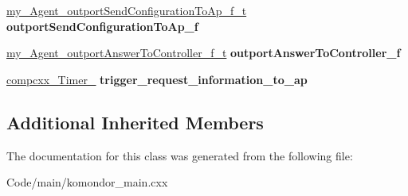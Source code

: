 \begin{DoxyCompactItemize}
\item 
\mbox{\label{classcompcxx__Agent__25_abe7d79ae04ff57646e7d29030f8a36c2}} 
\hyperlink{classcompcxx__Agent__25_1_1my__Agent__outportSendConfigurationToAp__f__t}{my\+\_\+\+Agent\+\_\+outport\+Send\+Configuration\+To\+Ap\+\_\+f\+\_\+t} {\bfseries outport\+Send\+Configuration\+To\+Ap\+\_\+f}
\item 
\mbox{\label{classcompcxx__Agent__25_ab5641f447eebe576ae65136ab8229712}} 
\hyperlink{classcompcxx__Agent__25_1_1my__Agent__outportAnswerToController__f__t}{my\+\_\+\+Agent\+\_\+outport\+Answer\+To\+Controller\+\_\+f\+\_\+t} {\bfseries outport\+Answer\+To\+Controller\+\_\+f}
\item 
\mbox{\label{classcompcxx__Agent__25_a662cb6f32dac818e3a215f9cb4a9f73d}} 
\hyperlink{classcompcxx__Timer__20}{compcxx\+\_\+\+Timer\+\_} {\bfseries trigger\+\_\+request\+\_\+information\+\_\+to\+\_\+ap}
\end{DoxyCompactItemize}
\subsection*{Additional Inherited Members}


The documentation for this class was generated from the following file\+:\begin{DoxyCompactItemize}
\item 
Code/main/komondor\+\_\+main.\+cxx\end{DoxyCompactItemize}
